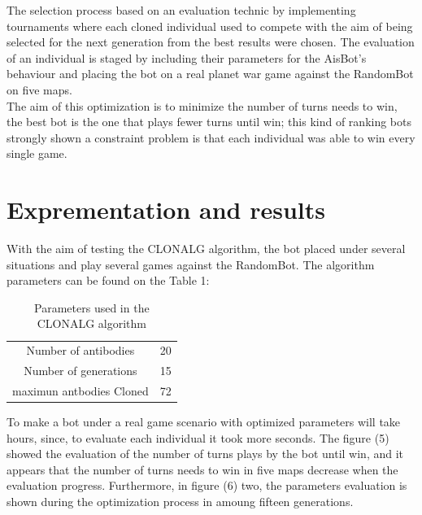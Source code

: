 \documentclass[conference]{IEEEtran}
\begin{document}
The selection process based on an evaluation technic by implementing tournaments where each cloned individual used to compete with the aim of being selected for the next generation from the best results were chosen. The evaluation of an individual is staged by including their parameters for the AisBot's behaviour and placing the bot on a real planet war game against the RandomBot on five maps. \\

The aim of this optimization is to minimize the number of turns needs to win, the best bot is the one that plays fewer turns until win; this kind of ranking bots strongly shown a constraint problem is that each individual was able to win every single game.

\section{Exprementation and results}
With the aim of testing the CLONALG algorithm, the bot placed under several situations and play several games against the RandomBot. The algorithm parameters can be found on the Table 1:
\begin{table}[!h]
\centering
\begin{tabular}{ |c|c| }
\hline
 Number of antibodies & 20 \\ 
 Number of generations & 15 \\  
 maximun antbodies Cloned & 72 \\ 
 \hline   
\end{tabular}
\caption{Parameters used in the CLONALG algorithm}
\label{TABLE 1}
\end{table}


To make a bot under a real game scenario with optimized parameters will take hours, since, to evaluate each individual it took more seconds. The figure (5) showed the evaluation of the number of turns plays by the bot until win, and it appears that the number of turns needs to win in five maps decrease when the evaluation progress. Furthermore, in figure (6) two, the parameters evaluation is shown during the optimization process in amoung fifteen generations. \\
\end{document}
